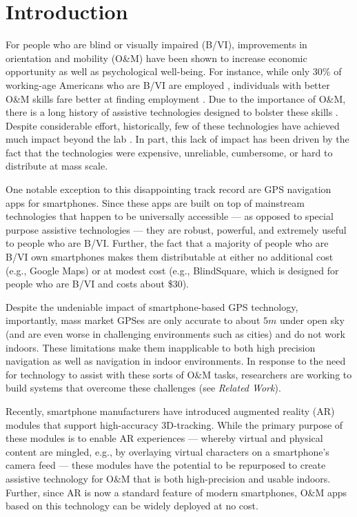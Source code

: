 \documentclass[chi_draft]{sigchi}
\newcommand{\BVI}{B/VI\xspace}
\newcommand{\OM}{O\&M\xspace}
\begin{document}
\section{Introduction}
For people who are blind or visually impaired (\BVI), improvements in orientation and mobility (\OM) have been shown to increase economic opportunity as well as psychological well-being.  For instance, while only 30\% of working-age Americans who are \BVI are employed \cite{employmentstatistics2017, kirchner1999looking}, individuals with better \OM skills fare better at finding employment \cite{crudden1998comprehensive, crudden1999barriers, leonard1999factors, o1999employment}.  Due to the importance of \OM, there is a long history of assistive technologies designed to bolster these skills  \cite{benjamin1973new, borenstein1997guidecane}.  Despite considerable effort, historically, few of these technologies have achieved much impact beyond the lab \cite{wiener2010foundations}.  In part, this lack of impact has been driven by the fact that the technologies were expensive, unreliable, cumbersome, or hard to distribute at mass scale.

One notable exception to this disappointing track record are GPS navigation apps for smartphones.  Since these apps are built on top of mainstream technologies that happen to be universally accessible --- as opposed to special purpose assistive technologies --- they are robust, powerful, and extremely useful to people who are \BVI.  Further, the fact that a majority of people who are \BVI own smartphones \cite{morris2014blind} makes them distributable at either no additional cost (e.g., Google Maps) or at modest cost (e.g., BlindSquare, which is designed for people who are \BVI and costs about \$30).

Despite the undeniable impact of smartphone-based GPS technology, importantly, mass market GPSes are only accurate to about $5m$ under open sky (and are even worse in challenging environments such as cities) and do not work indoors.  These limitations make them inapplicable to both high precision navigation as well as navigation in indoor environments.  In response to the need for technology to assist with these sorts of \OM tasks, researchers are working to build systems that overcome these challenges (see \emph{Related Work}).

Recently, smartphone manufacturers have introduced augmented reality (AR) modules that support high-accuracy 3D-tracking.  While the primary purpose of these modules is to enable AR experiences --- whereby virtual and physical content are mingled, e.g., by overlaying virtual characters on a smartphone's camera feed --- these modules have the potential to be repurposed to create assistive technology for \OM that is both high-precision and usable indoors.  Further, since AR is now a standard feature of modern smartphones, \OM apps based on this technology can be widely deployed at no cost.
\end{document}
